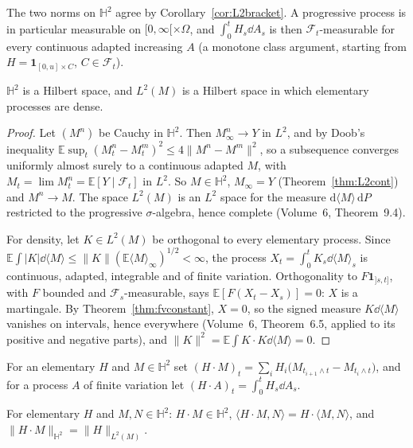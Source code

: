 The two norms on $\mathbb H^2$ agree by Corollary~\ref{cor:L2bracket}. A progressive process is in particular measurable on $[0,\infty[\times\Omega$, and $\int_0^tH_s\dd A_s$ is then $\mathcal F_t$-measurable for every
continuous adapted increasing $A$ (a monotone class argument, starting from $H=\mathbf 1_{[0,u]\times C}$, $C\in\mathcal F_t$).

\begin{lemma}\label{lem:H2complete}
$\mathbb H^2$ is a Hilbert space, and $L^2(M)$ is a Hilbert space in which elementary processes are dense.
\end{lemma}

\begin{proof}
Let $(M^n)$ be Cauchy in $\mathbb H^2$. Then $M^n_\infty\to Y$ in $L^2$, and by Doob's inequality $\mathbb E\sup_t(M^n_t-M^m_t)^2\le4\|M^n-M^m\|^2$, so a subsequence converges uniformly almost surely to a continuous
adapted $M$, with $M_t=\lim M^n_t=\mathbb E[Y\mid\mathcal F_t]$ in $L^2$. So $M\in\mathbb H^2$, $M_\infty=Y$ (Theorem~\ref{thm:L2cont}) and $M^n\to M$. The space $L^2(M)$ is an $L^2$ space for the measure
$\mathrm d\langle M\rangle\,\mathrm dP$ restricted to the progressive $\sigma$-algebra, hence complete (Volume~6, Theorem~9.4).

For density, let $K\in L^2(M)$ be orthogonal to every elementary process. Since $\mathbb E\int|K|\dd\langle M\rangle\le\|K\|(\mathbb E\langle M\rangle_\infty)^{1/2}<\infty$, the process $X_t=\int_0^tK_s\dd\langle M\rangle_s$ is
continuous, adapted, integrable and of finite variation. Orthogonality to $F\mathbf 1_{]s,t]}$, with $F$ bounded and $\mathcal F_s$-measurable, says $\mathbb E[F(X_t-X_s)]=0$: $X$ is a martingale. By
Theorem~\ref{thm:fvconstant}, $X=0$, so the signed measure $K\dd\langle M\rangle$ vanishes on intervals, hence everywhere (Volume~6, Theorem~6.5, applied to its positive and negative parts), and
$\|K\|^2=\mathbb E\int K\cdot K\dd\langle M\rangle=0$.
\end{proof}

For an elementary $H$ and $M\in\mathbb H^2$ set $(H\cdot M)_t=\sum_iH_i\bigl(M_{t_{i+1}\wedge t}-M_{t_i\wedge t}\bigr)$, and for a process $A$ of finite variation let $(H\cdot A)_t=\int_0^tH_s\dd A_s$.

\begin{lemma}\label{lem:elementary}
For elementary $H$ and $M,N\in\mathbb H^2$: $H\cdot M\in\mathbb H^2$, $\langle H\cdot M,N\rangle=H\cdot\langle M,N\rangle$, and $\|H\cdot M\|_{\mathbb H^2}=\|H\|_{L^2(M)}$.
\end{lemma}

